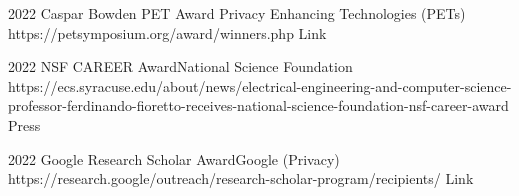  

\begin{awards}
	\awardentry
	{2022}
	{Caspar Bowden PET Award}%
	{Privacy Enhancing Technologies (PETs)}
	{https://petsymposium.org/award/winners.php}
	{Link}

	\awardentry
	{2022}
	{NSF CAREER Award}{National Science Foundation}
	{https://ecs.syracuse.edu/about/news/electrical-engineering-and-computer-science-professor-ferdinando-fioretto-receives-national-science-foundation-nsf-career-award}
	{Press}

	\awardentry
	{2022}
	{Google Research Scholar Award}{Google (Privacy)}
	{https://research.google/outreach/research-scholar-program/recipients/}
	{Link}


\end{awards}
